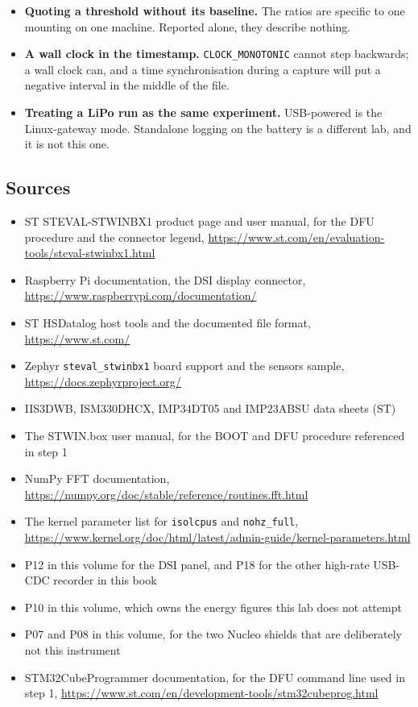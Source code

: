 \begin{itemize}
\item \textbf{Quoting a threshold without its baseline.} The ratios are specific to one mounting on one machine. Reported alone, they describe nothing.
\item \textbf{A wall clock in the timestamp.} \texttt{CLOCK\_MONOTONIC} cannot step backwards; a wall clock can, and a time synchronisation during a capture will put a negative interval in the middle of the file.
\item \textbf{Treating a LiPo run as the same experiment.} USB-powered is the Linux-gateway mode. Standalone logging on the battery is a different lab, and it is not this one.
\end{itemize}

\subsection*{Sources}

\begin{itemize}
\item ST STEVAL-STWINBX1 product page and user manual, for the DFU procedure and the connector legend, \url{https://www.st.com/en/evaluation-tools/steval-stwinbx1.html}
\item Raspberry Pi documentation, the DSI display connector, \url{https://www.raspberrypi.com/documentation/}
\item ST HSDatalog host tools and the documented file format, \url{https://www.st.com/}
\item Zephyr \texttt{steval\_stwinbx1} board support and the sensors sample, \url{https://docs.zephyrproject.org/}
\item IIS3DWB, ISM330DHCX, IMP34DT05 and IMP23ABSU data sheets (ST)
\item The STWIN.box user manual, for the BOOT and DFU procedure referenced in step 1
\item NumPy FFT documentation, \url{https://numpy.org/doc/stable/reference/routines.fft.html}
\item The kernel parameter list for \texttt{isolcpus} and \texttt{nohz\_full}, \url{https://www.kernel.org/doc/html/latest/admin-guide/kernel-parameters.html}
\item P12 in this volume for the DSI panel, and P18 for the other high-rate USB-CDC recorder in this book
\item P10 in this volume, which owns the energy figures this lab does not attempt
\item P07 and P08 in this volume, for the two Nucleo shields that are deliberately not this instrument
\item STM32CubeProgrammer documentation, for the DFU command line used in step 1, \url{https://www.st.com/en/development-tools/stm32cubeprog.html}
\end{itemize}
